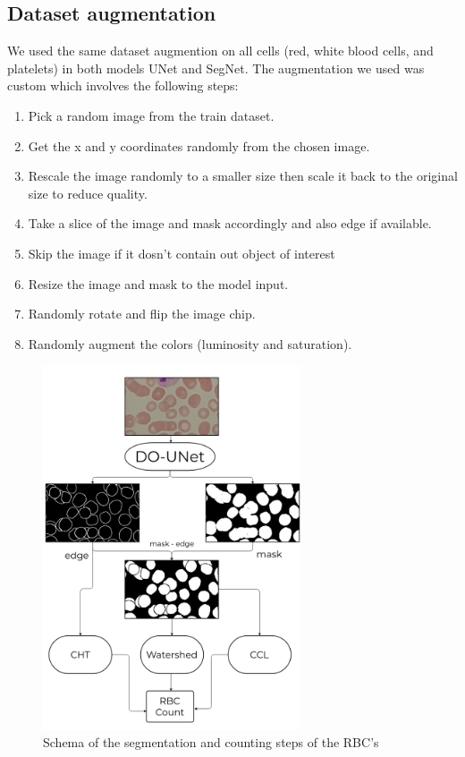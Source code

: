 \documentclass[conference]{IEEEtran}
\begin{document}


\subsection{Dataset augmentation}
\hspace{\parindent}
We used the same dataset augmention on all cells (red, white blood cells, and platelets) in both models UNet and SegNet.
The augmentation we used was custom which involves the following steps:
\begin{enumerate}
    \item Pick a random image from the train dataset.
    \item Get the x and y coordinates randomly from the chosen image.
    \item Rescale the image randomly to a smaller size then scale it back to the original size to reduce quality.
    \item Take a slice of the image and mask accordingly and also edge if available.
    \item Skip the image if it dosn't contain out object of interest
    \item Resize the image and mask to the model input.
    \item Randomly rotate and flip the image chip.
    \item Randomly augment the colors (luminosity and saturation).
\end{enumerate}

\begin{figure}[H]
\centering
  \vspace{-0.1in}
    \centerline{\includegraphics[width = 3in]{images/Diag_RBC_DOUNET_SegNet.png}}
    \caption{Schema of the segmentation and counting steps of the RBC's}
    \label{fig:scheme_RBC}
\end{figure}
\end{document}
